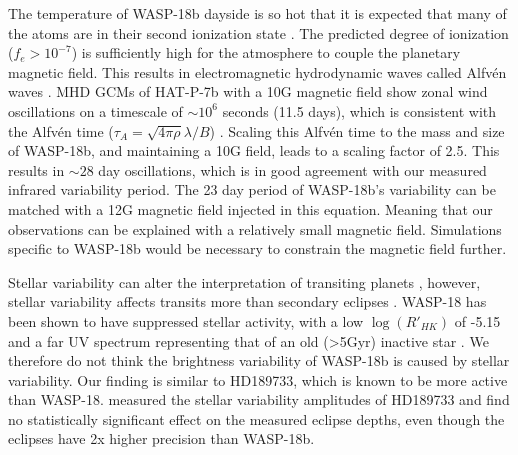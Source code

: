The temperature of WASP-18b dayside is so hot that it is expected that many of the atoms are in their second ionization state \citep{Helling2019b}. The predicted degree of ionization ($f_e > 10^{-7}$) is sufficiently high for the atmosphere to couple the planetary magnetic field. This results in electromagnetic hydrodynamic waves called Alfv\'en waves \citep{Alfven1942}. MHD GCMs of HAT-P-7b with a 10G magnetic field show zonal wind oscillations on a timescale of $\sim10^6$ seconds (11.5 days), which is consistent with the Alfv\'en time ($\tau_A=\sqrt{4\pi\rho}\lambda/B$) \citep{Rogers2017}. Scaling this Alfv\'en time to the mass and size of WASP-18b, and maintaining a 10G field, leads to a scaling factor of 2.5. This results in $\sim28$ day oscillations, which is in good agreement with our measured infrared variability period. The 23 day period of WASP-18b's variability can be matched with a 12G magnetic field injected in this equation. Meaning that our observations can be explained with a relatively small magnetic field. Simulations specific to WASP-18b would be necessary to constrain the magnetic field further.



Stellar variability can alter the interpretation of transiting planets \citep[e.g.,][]{Pont2008, Oshagh2014, Desert2011b}, however, stellar variability affects transits more than secondary eclipses \citep{Zellem2017}. WASP-18 has been shown to have suppressed stellar activity, with a low $\log(R'_{HK})$ of -5.15 \citep{Lanza2014} and a far UV spectrum representing that of an old (>5Gyr) inactive star \citep{Fossati2018}. We therefore do not think the brightness variability of WASP-18b is caused by stellar variability. Our finding is similar to HD189733, which is known to be more active than WASP-18. \citet{Kilpatrick2020} measured the stellar variability amplitudes of HD189733 and find no statistically significant effect on the measured eclipse depths, even though the eclipses have 2x higher precision than WASP-18b.

